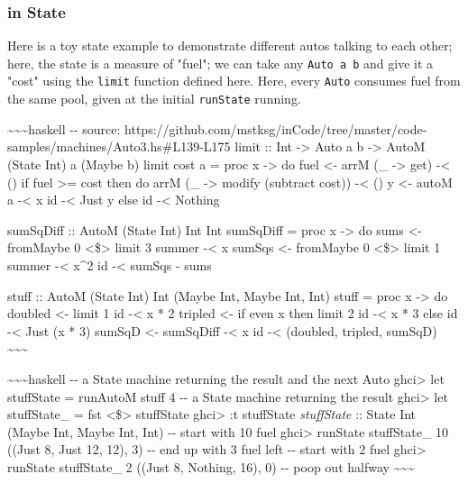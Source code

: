 \documentclass[]{article}
\begin{document}
\subsubsection{in State}

Here is a toy state example to demonstrate different autos talking to each
other; here, the state is a measure of "fuel"; we can take any
\texttt{Auto\ a\ b} and give it a "cost" using the \texttt{limit} function
defined here. Here, every \texttt{Auto} consumes fuel from the same pool, given
at the initial \texttt{runState} running.

\textasciitilde{}\textasciitilde{}\textasciitilde{}haskell -\/- source:
https://github.com/mstksg/inCode/tree/master/code-samples/machines/Auto3.hs\#L139-L175
limit :: Int -\textgreater{} Auto a b -\textgreater{} AutoM (State Int) a (Maybe
b) limit cost a = proc x -\textgreater{} do fuel \textless{}- arrM (\_
-\textgreater{} get) -\textless{} () if fuel \textgreater{}= cost then do arrM
(\_ -\textgreater{} modify (subtract cost)) -\textless{} () y \textless{}- autoM
a -\textless{} x id -\textless{} Just y else id -\textless{} Nothing

sumSqDiff :: AutoM (State Int) Int Int sumSqDiff = proc x -\textgreater{} do
sums \textless{}- fromMaybe 0 \textless{}\$\textgreater{} limit 3 summer
-\textless{} x sumSqs \textless{}- fromMaybe 0 \textless{}\$\textgreater{} limit
1 summer -\textless{} x\^{}2 id -\textless{} sumSqs - sums

stuff :: AutoM (State Int) Int (Maybe Int, Maybe Int, Int) stuff = proc x
-\textgreater{} do doubled \textless{}- limit 1 id -\textless{} x * 2 tripled
\textless{}- if even x then limit 2 id -\textless{} x * 3 else id -\textless{}
Just (x * 3) sumSqD \textless{}- sumSqDiff -\textless{} x id -\textless{}
(doubled, tripled, sumSqD) \textasciitilde{}\textasciitilde{}\textasciitilde{}

\textasciitilde{}\textasciitilde{}\textasciitilde{}haskell -\/- a State machine
returning the result and the next Auto ghci\textgreater{} let stuffState =
runAutoM stuff 4 -\/- a State machine returning the result ghci\textgreater{}
let stuffState\_ = fst \textless{}\$\textgreater{} stuffState ghci\textgreater{}
:t stuffState\emph{ stuffState} :: State Int (Maybe Int, Maybe Int, Int) -\/-
start with 10 fuel ghci\textgreater{} runState stuffState\_ 10 ((Just 8, Just
12, 12), 3) -\/- end up with 3 fuel left -\/- start with 2 fuel
ghci\textgreater{} runState stuffState\_ 2 ((Just 8, Nothing, 16), 0) -\/- poop
out halfway \textasciitilde{}\textasciitilde{}\textasciitilde{}
\end{document}
